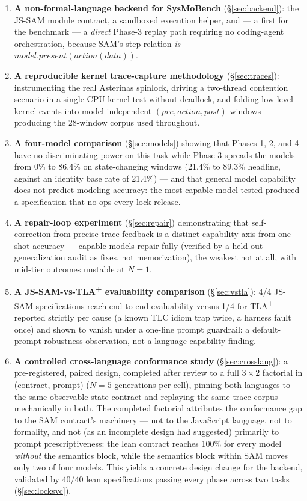 \documentclass[11pt]{article}
\newcommand{\jssam}{JS-SAM}
\newcommand{\tlaplus}{TLA\texorpdfstring{\textsuperscript{+}}{+}}
\begin{document}
\begin{enumerate}
\item \textbf{A non-formal-language backend for SysMoBench}
  (\S\ref{sec:backend}): the \jssam{} module contract, a sandboxed execution
  helper, and --- a first for the benchmark --- a \emph{direct} Phase-3
  replay path requiring no coding-agent orchestration, because SAM's step
  relation \emph{is} $\mathit{model.present}(\mathit{action}(\mathit{data}))$.
\item \textbf{A reproducible kernel trace-capture methodology}
  (\S\ref{sec:traces}): instrumenting the real Asterinas spinlock, driving a
  two-thread contention scenario in a single-CPU kernel test without deadlock,
  and folding low-level kernel events into model-independent
  $(\mathit{pre}, \mathit{action}, \mathit{post})$ windows --- producing the
  28-window corpus used throughout.
\item \textbf{A four-model comparison} (\S\ref{sec:models}) showing that
  Phases 1, 2, and 4 have no discriminating power on this task while Phase 3
  spreads the models from 0\% to 86.4\% on state-changing windows (21.4\% to
  89.3\% headline, against an identity base rate of 21.4\%) --- and that
  general model capability does not predict modeling accuracy: the most
  capable model tested produced a specification that no-ops every lock
  release.
\item \textbf{A repair-loop experiment} (\S\ref{sec:repair}) demonstrating
  that self-correction from precise trace feedback is a distinct capability
  axis from one-shot accuracy --- capable models repair fully (verified by a
  held-out generalization audit as fixes, not memorization), the weakest not
  at all, with mid-tier outcomes unstable at $N{=}1$.
\item \textbf{A \jssam{}-vs-\tlaplus{} evaluability comparison}
  (\S\ref{sec:vstla}): 4/4 \jssam{} specifications reach end-to-end
  evaluability versus 1/4 for \tlaplus{} --- reported strictly per cause
  (a known TLC idiom trap twice, a harness fault once) and shown to vanish
  under a one-line prompt guardrail: a default-prompt robustness
  observation, not a language-capability finding.
\item \textbf{A controlled cross-language conformance study}
  (\S\ref{sec:crosslang}): a pre-registered, paired design, completed after
  review to a full $3{\times}2$ factorial in (contract, prompt)
  ($N{=}5$ generations per cell), pinning both languages
  to the same observable-state contract and replaying the same trace corpus
  mechanically in both. The completed factorial attributes the conformance
  gap to the SAM contract's machinery --- not to the JavaScript language, not
  to formality, and not (as an incomplete design had suggested) primarily to
  prompt prescriptiveness: the lean contract reaches 100\% for every model
  \emph{without} the semantics block, while the semantics block within SAM
  moves only two of four models. This yields a concrete design change for
  the backend, validated by 40/40 lean specifications passing every phase
  across two tasks
  (\S\ref{sec:locksvc}).
\end{enumerate}
\end{document}

